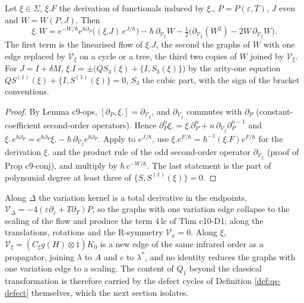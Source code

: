 \begin{proposition}
\label{prop:qs-ward}
Let $\xi\in\Sigma$, $\xi.F$ the derivation of functionals induced by $\xi.$, $P=P(\varepsilon,T)$, $J$ even and $W=W(P,J)$. Then
\begin{equation}
\xi.\,W=e^{-W/\hbar}e^{\hbar\partial_P}\big((\xi.J)\,e^{J/\hbar}\big)-\hbar\,\partial_{\mathcal V_\xi}W-\tfrac12\big(\partial_{\mathcal V_\xi}(W^2)-2W\,\partial_{\mathcal V_\xi}W\big).
\label{eq:qs-ward}
\end{equation}
The first term is the linearised flow of $\xi.J$, the second the graphs of $W$ with one edge replaced by $\mathcal V_\xi$ on a cycle or a tree, the third two copies of $W$ joined by $\mathcal V_\xi$. For $J=I+\delta M$, $\xi.I=\pm\big(QS_3(\xi)+\{I,S_3(\xi)\}\big)$ by the arity-one equation $QS^{(1)}(\xi)+\{I,S^{(1)}(\xi)\}=0$, $S_3$ the cubic part, with the sign of the bracket conventions.
\end{proposition}

\begin{proof}
By Lemma c9-ops, $[\partial_P,\xi.]=\partial_{\mathcal V_\xi}$, and $\partial_{\mathcal V_\xi}$ commutes with $\partial_P$ (constant-coefficient second-order operators). Hence $\partial_P^n\xi.=\xi.\partial_P^n+n\,\partial_{\mathcal V_\xi}\partial_P^{n-1}$ and $\xi.\,e^{\hbar\partial_P}=e^{\hbar\partial_P}\xi.-\hbar\,\partial_{\mathcal V_\xi}e^{\hbar\partial_P}$. Apply to $e^{J/\hbar}$, use $\xi.e^{F/\hbar}=\hbar^{-1}(\xi.F)e^{F/\hbar}$ for the derivation $\xi.$ and the product rule of the odd second-order operator $\partial_{\mathcal V_\xi}$ (proof of Prop c9-conj), and multiply by $\hbar\,e^{-W/\hbar}$. The last statement is the part of polynomial degree at least three of $\{S,S^{(1)}(\xi)\}=0$.
\end{proof}

\begin{remark}
\label{rem:qs-ward}
Along $\Delta$ the variation kernel is a total derivative in the endpoints, $\mathcal V_\Delta=-4(\varepsilon\partial_\varepsilon+T\partial_T)P$, so the graphs with one variation edge collapse to the scaling of the flow and produce the term $4\,\mathrm{lc}$ of Thm c10-D1; along the translations, rotations and the R-symmetry $\mathcal V_x=0$. Along $\xi$, $\mathcal V_\xi=(C_\xi g(H)\otimes1)K_0$ is a new edge of the same infrared order as a propagator, joining $\lambda$ to $A$ and $c$ to $\lambda^*$, and no identity reduces the graphs with one variation edge to a scaling. The content of $Q_1$ beyond the classical transformation is therefore carried by the defect cycles of Definition \ref{def:qs-defect} themselves, which the next section isolates.
\end{remark}

